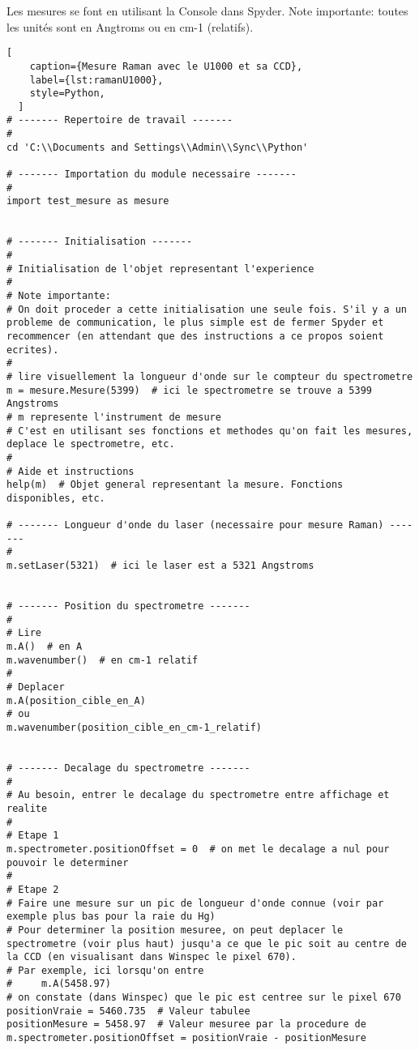 \documentclass[11pt,francais]{book} %
\begin{document}
Les mesures se font en utilisant la Console dans Spyder.
Note importante: toutes les unités sont en Angtroms ou en cm-1 (relatifs).

\begin{lstlisting}[
    caption={Mesure Raman avec le U1000 et sa CCD},
    label={lst:ramanU1000},
    style=Python,
  ]  
# ------- Repertoire de travail ------- 
#
cd 'C:\\Documents and Settings\\Admin\\Sync\\Python'

# ------- Importation du module necessaire ------- 
#
import test_mesure as mesure


# ------- Initialisation ------- 
#
# Initialisation de l'objet representant l'experience
#
# Note importante:
# On doit proceder a cette initialisation une seule fois. S'il y a un probleme de communication, le plus simple est de fermer Spyder et recommencer (en attendant que des instructions a ce propos soient ecrites).
#	
# lire visuellement la longueur d'onde sur le compteur du spectrometre
m = mesure.Mesure(5399)  # ici le spectrometre se trouve a 5399 Angstroms
# m represente l'instrument de mesure
# C'est en utilisant ses fonctions et methodes qu'on fait les mesures, deplace le spectrometre, etc.
#
# Aide et instructions
help(m)  # Objet general representant la mesure. Fonctions disponibles, etc.

# ------- Longueur d'onde du laser (necessaire pour mesure Raman) ------- 
#
m.setLaser(5321)  # ici le laser est a 5321 Angstroms


# ------- Position du spectrometre ------- 
#
# Lire
m.A()  # en A
m.wavenumber()  # en cm-1 relatif
#
# Deplacer
m.A(position_cible_en_A)
# ou
m.wavenumber(position_cible_en_cm-1_relatif)


# ------- Decalage du spectrometre ------- 
#
# Au besoin, entrer le decalage du spectrometre entre affichage et realite
#
# Etape 1
m.spectrometer.positionOffset = 0  # on met le decalage a nul pour pouvoir le determiner
#
# Etape 2
# Faire une mesure sur un pic de longueur d'onde connue (voir par exemple plus bas pour la raie du Hg)
# Pour determiner la position mesuree, on peut deplacer le spectrometre (voir plus haut) jusqu'a ce que le pic soit au centre de la CCD (en visualisant dans Winspec le pixel 670).
# Par exemple, ici lorsqu'on entre
#     m.A(5458.97)
# on constate (dans Winspec) que le pic est centree sur le pixel 670
positionVraie = 5460.735  # Valeur tabulee
positionMesure = 5458.97  # Valeur mesuree par la procedure de
m.spectrometer.positionOffset = positionVraie - positionMesure



\end{lstlisting}
\end{document}
